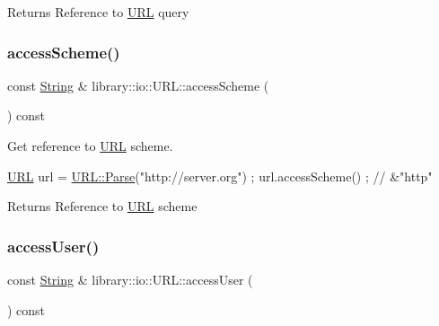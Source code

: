 \begin{DoxyReturn}{Returns}
Reference to \hyperlink{classlibrary_1_1io_1_1_u_r_l}{U\+RL} query 
\end{DoxyReturn}
\mbox{\label{classlibrary_1_1io_1_1_u_r_l_a01c171ddf3398a26bb3453d72ff73954}} 
\subsubsection{\texorpdfstring{access\+Scheme()}{accessScheme()}}
{\footnotesize\ttfamily const \hyperlink{namespacelibrary_1_1io_a7469b45835a4421045db344d6a5a1f85}{String} \& library\+::io\+::\+U\+R\+L\+::access\+Scheme (\begin{DoxyParamCaption}{ }\end{DoxyParamCaption}) const}



Get reference to \hyperlink{classlibrary_1_1io_1_1_u_r_l}{U\+RL} scheme. 


\begin{DoxyCode}
\hyperlink{classlibrary_1_1io_1_1_u_r_l_a7e9c070138a6dbd000ffb10b7cd8a5c4}{URL} url = \hyperlink{classlibrary_1_1io_1_1_u_r_l_a03a589af0787df20428d4d33e26bb2d7}{URL::Parse}(\textcolor{stringliteral}{"http://server.org"}) ;
url.accessScheme() ; \textcolor{comment}{// &"http"}
\end{DoxyCode}


\begin{DoxyReturn}{Returns}
Reference to \hyperlink{classlibrary_1_1io_1_1_u_r_l}{U\+RL} scheme 
\end{DoxyReturn}
\mbox{\label{classlibrary_1_1io_1_1_u_r_l_a5a6f01efe6b77518e47ceafe50386c3e}} 
\subsubsection{\texorpdfstring{access\+User()}{accessUser()}}
{\footnotesize\ttfamily const \hyperlink{namespacelibrary_1_1io_a7469b45835a4421045db344d6a5a1f85}{String} \& library\+::io\+::\+U\+R\+L\+::access\+User (\begin{DoxyParamCaption}{ }\end{DoxyParamCaption}) const}




